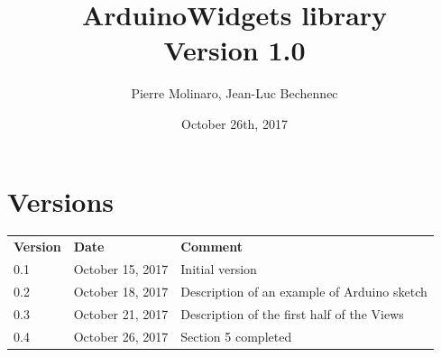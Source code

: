 \documentclass[a4paper,11pt]{extarticle}
\begin{document}
 


\title{\bf \Huge{ArduinoWidgets library\\Version 1.0}}
\author{Pierre Molinaro, Jean-Luc Bechennec}
\date {October 26th, 2017}

\maketitle


\tableofcontents
\listoffigures


\section{Versions}
  \begin{tabular}{llp{10.5cm}}
    \textbf{Version} & \textbf{Date} & \textbf{Comment}\\
    0.1 & October 15, 2017 & Initial version \\
    0.2 & October 18, 2017 & Description of an example of Arduino sketch \\
    0.3 & October 21, 2017 & Description of the first half of the Views\\
    0.4 & October 26, 2017 & Section 5 completed


  \end{tabular}
\end{document}
